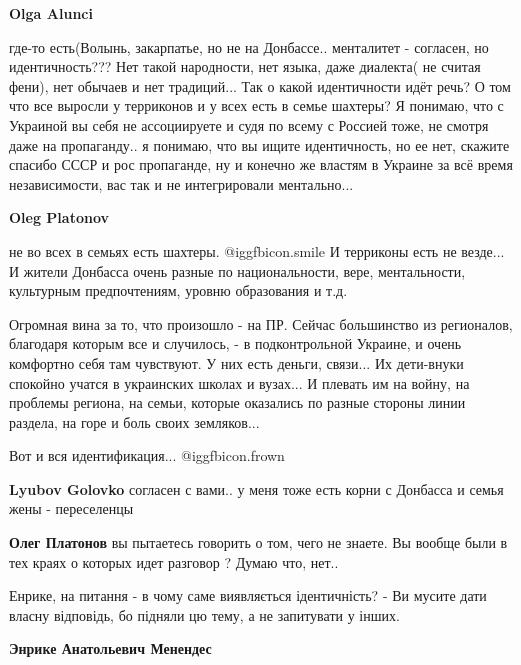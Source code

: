 \begin{itemize}
\begin{itemize}
\textbf{Olga Alunci} 

где-то есть(Волынь, закарпатье, но не на Донбассе.. менталитет - согласен, но
идентичность??? Нет такой народности, нет языка, даже диалекта( не считая
фени), нет обычаев и нет традиций... Так о какой идентичности идёт речь? О том
что все выросли у терриконов и у всех есть в семье шахтеры? Я понимаю, что с
Украиной вы себя не ассоциируете и судя по всему с Россией тоже, не смотря даже
на пропаганду.. я понимаю, что вы ищите идентичность, но ее нет, скажите
спасибо СССР и рос пропаганде, ну и конечно же властям в Украине за всё время
независимости, вас так и не интегрировали ментально...

\textbf{Oleg Platonov} 

не во всех в семьях есть шахтеры. @igg{fbicon.smile}  И терриконы есть не везде... И жители
Донбасса очень разные по национальности, вере, ментальности, культурным
предпочтениям, уровню образования и т.д.

Огромная вина за то, что произошло - на ПР. Сейчас большинство из регионалов,
благодаря которым все и случилось, - в подконтрольной Украине, и очень
комфортно себя там чувствуют. У них есть деньги, связи... Их дети-внуки
спокойно учатся в украинских школах и вузах... И плевать им на войну, на
проблемы региона, на семьи, которые оказались по разные стороны линии раздела,
на горе и боль своих земляков...

Вот и вся идентификация... @igg{fbicon.frown} 

\textbf{Lyubov Golovko} согласен с вами.. у меня тоже есть корни с Донбасса и семья жены - переселенцы

\textbf{Олег Платонов} вы пытаетесь говорить о том, чего не знаете. Вы вообще были в тех краях о которых идет разговор ? Думаю что, нет..


Енрике, на питання - в чому саме виявляється ідентичність? - Ви мусите дати
власну відповідь, бо підняли цю тему, а не запитувати у інших.

\textbf{Энрике Анатольевич Менендес} 


\end{itemize}
\end{itemize}
